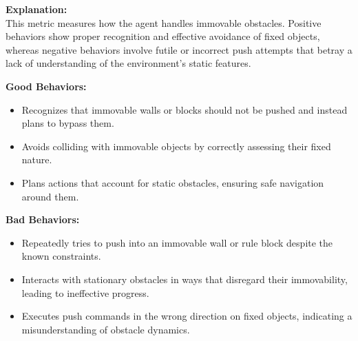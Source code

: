 \fontsize{9.5pt}{11pt}\selectfont
\begin{tcolorbox}[ colback=gray!5!white, colframe=gray!90, title=\textbf{\textcolor{black}{Iteration 3: Interaction with Immovable Obstacles}}]
  
\textbf{Explanation:} \\
This metric measures how the agent handles immovable obstacles. Positive behaviors show proper recognition and effective avoidance of fixed objects, whereas negative behaviors involve futile or incorrect push attempts that betray a lack of understanding of the environment’s static features.

\vspace{1em}
\textbf{Good Behaviors:}
\begin{itemize}
    \item Recognizes that immovable walls or blocks should not be pushed and instead plans to bypass them.
    \item Avoids colliding with immovable objects by correctly assessing their fixed nature.
    \item Plans actions that account for static obstacles, ensuring safe navigation around them.
\end{itemize}

\vspace{0.5em}
\textbf{Bad Behaviors:}
\begin{itemize}
    \item Repeatedly tries to push into an immovable wall or rule block despite the known constraints.
    \item Interacts with stationary obstacles in ways that disregard their immovability, leading to ineffective progress.
    \item Executes push commands in the wrong direction on fixed objects, indicating a misunderstanding of obstacle dynamics.
\end{itemize}

\end{tcolorbox}